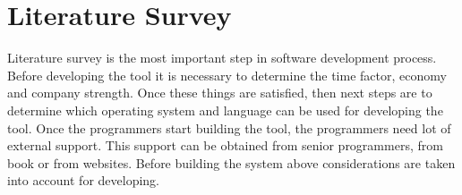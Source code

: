 \chapter{Literature Survey}


Literature survey is the most important step in software development process. Before developing the tool it is necessary to determine the time factor, economy and company strength. Once these things are satisfied, then next steps are to determine which operating system and language can be used for developing the tool. Once the programmers start building the tool, the programmers need lot of external support. This support can be obtained from senior programmers, from book or from websites. Before building the system above considerations are taken into account for developing.

